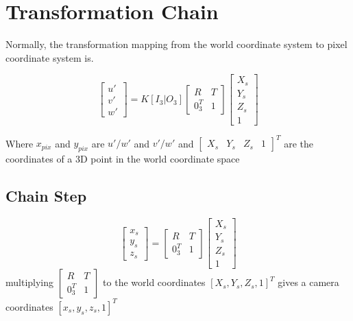 \documentclass[a4paper, twoside, english]{article}
\begin{document}
\section{Transformation Chain}

Normally, the transformation mapping from the world coordinate system to pixel coordinate system is.

\begin{equation*}
	\begin{bmatrix}
		u' \\
		v' \\
		w'
	\end{bmatrix} = K[I_3| O_3]
	\begin{bmatrix}
	R & T \\
	0_3^T & 1
	\end{bmatrix}
	\begin{bmatrix}
	X_s \\
	Y_s \\
	Z_s \\
	1
	\end{bmatrix}
\end{equation*}


Where $x_{pix}$ and $y_{pix}$ are $u'/w'$ and $v'/w'$ 
and $
\begin{bmatrix}
	X_s & Y_s & Z_s & 1
\end{bmatrix}^T 
$ are the coordinates of a 3D point in the world coordinate space

\subsection{Chain Step}
\begin{equation*}
\begin{bmatrix}
x_s \\
y_s \\
z_s
\end{bmatrix}
=
\begin{bmatrix}
	R & T \\
	0_3^T & 1
\end{bmatrix}
\begin{bmatrix}
	X_s \\
	Y_s \\
	Z_s \\
	1
\end{bmatrix}
\end{equation*}
multiplying $\begin{bmatrix}
R & T \\
0_3^T & 1
\end{bmatrix}$ to the world coordinates $[X_s,Y_s,Z_s,1]^T$ gives a camera coordinates $[x_s,y_s,z_s,1]^T$
\end{document}
